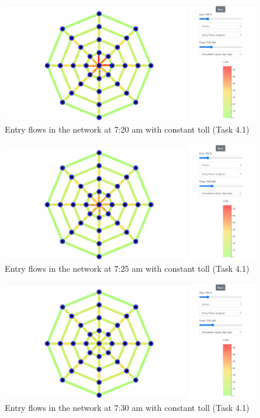 \documentclass[a4paper, 12pt,oneside]{article}
\begin{document}
\begin{minipage}[c]{0.5\textwidth}
\begin{figure}[H]
    \centering
    \includegraphics[width=1\textwidth]{Images/Step4/results_on_network__task4.1_720am.png}
    \caption{Entry flows in the network at 7:20 am with constant toll (Task 4.1)}
    \label{fig:Entry flows in the network at 7:20 am with constant toll (Task 4.1)}
\end{figure}
\end{minipage}
\begin{minipage}[c]{0.5\textwidth}
\begin{figure}[H]
    \centering
    \includegraphics[width=1\textwidth]{Images/Step4/results_on_network__task4.1_725am.png}
    \caption{Entry flows in the network at 7:25 am with constant toll (Task 4.1)}
    \label{fig:Entry flows in the network at 7:25 am with constant toll (Task 4.1)}
\end{figure}
\end{minipage}
\begin{minipage}[c]{0.5\textwidth}
\begin{figure}[H]
    \centering
    \includegraphics[width=1\textwidth]{Images/Step4/results_on_network__task4.1_730am.png}
    \caption{Entry flows in the network at 7:30 am with constant toll (Task 4.1)}
    \label{fig:Entry flows in the network at 7:30 am with constant toll (Task 4.1)}
\end{figure}
\end{minipage}
\end{document}
